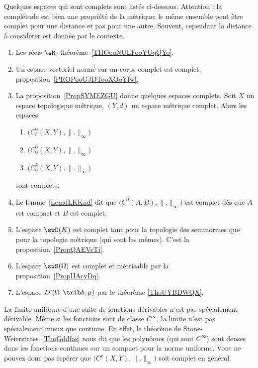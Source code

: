 Quelques espaces qui sont complets sont listés ci-dessous. Attention : la complétude est bien une propriété de la métrique; le même ensemble peut être complet pour une distance et pas pour une autre. Souvent, cependant la distance à considérer est donnée par  le contexte.
\begin{multicols}{2}
	\begin{enumerate}
		\item
		      Les réels \( \eR\), théorème~\ref{THOooNULFooYUqQYo}.
		\item
		      Un espace vectoriel normé sur un corps complet est complet, proposition~\ref{PROPooGJDTooXOoYfw}.
		\item
		      La proposition~\ref{PropSYMEZGU} donne quelques espaces complets. Soit \( X\) un espace topologique métrique, \( (Y,d)\) un espace métrique complet. Alors les espaces
		      \begin{enumerate}
			      \item
			            \( \big( C^0_b(X,Y),\| . \|_{\infty} \big)\)
			      \item
			            \( \big( C^0_0(X,Y),\| . \|_{\infty} \big)\)
			      \item
			            \( \big( C^k_0(X,Y),\| . \|_{\infty} \big)\)
		      \end{enumerate}
		      sont complets.
		\item
		      Le lemme~\ref{LemdLKKnd} dit que \( \big( C^0(A,B),\| . \|_{\infty}\big)\) est complet dès que \( A\) est compact et \( B\) est complet.

		\item
		      L'espace \( \swD(K)\) est complet tant pour la topologie des seminormes que pour la topologie métrique (qui sont les mêmes). C'est la proposition~\ref{PropQAEVcTi}.
		\item
		      L'espace \( \swS(\Omega)\) est complet et métrisable par la proposition~\ref{PropIIAcyDq}.
		\item
		      L'espace \( L^p(\Omega,\tribA,\mu)\) par le théorème \ref{ThoUYBDWQX}.
	\end{enumerate}
\end{multicols}

La limite uniforme d'une suite de fonctions dérivables n'est pas spécialement dérivable. Même si les fonctions sont de classe \(  C^{\infty}\), la limite n'est pas spécialement mieux que continue. En effet, le théorème de Stone-Weierstrass~\ref{ThoGddfas} nous dit que les polynômes (qui sont \(  C^{\infty}\)) sont denses dans les fonctions continues sur un compact pour la norme uniforme. Vous ne pouvez donc pas espérer que \( \big( C^p(X,Y),\| . \|_{\infty} \big)\) soit complet en général.

